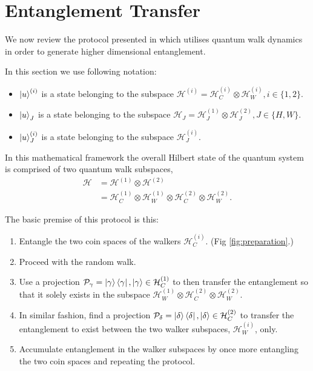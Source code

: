 \section{Entanglement Transfer}
We now review the protocol presented in \cite{giordani2020} which utilises quantum walk dynamics in order to generate higher dimensional entanglement. 

In this section we use following notation:
\begin{itemize}
    \item $\ket{u}^{(i)}$ is a state belonging to the subspace $\mathcal{H}^{(i)} = \mathcal{H}^{(i)}_C \otimes \mathcal{H}^{(i)}_W, i\in\{1,2\}$.
    \item $\ket{u}_J$ is a state belonging to the subspace $\mathcal{H}_J = \mathcal{H}^{(1)}_J \otimes \mathcal{H}^{(2)}_J, J\in\{H,W\}$.
    \item  $\ket{u}^{(i)}_J$ is a state belonging to the subspace $\mathcal{H}^{(i)}_J$.
\end{itemize}

In this mathematical framework the overall Hilbert state of the quantum system is comprised of two quantum walk subspaces,
\begin{align}
    \mathcal{H} &= \mathcal{H}^{(1)} \otimes \mathcal{H}^{(2)}\\
                &= \mathcal{H}^{(1)}_C \otimes \mathcal{H}^{(1)}_W \otimes \mathcal{H}^{(2)}_C \otimes \mathcal{H}^{(2)}_W.
\end{align}

The basic premise of this protocol is this:
\begin{enumerate}
    \item Entangle the two coin spaces of the walkers $\mathcal{H}^{(i)}_C$. (Fig \ref{fig:preparation}.)
    \item Proceed with the random walk.
    \item Use a projection $\mathcal{P}_\gamma = \ket{\gamma}\bra{\gamma}, \ket{\gamma}\in\mathcal{H}^{(1)}_C$ to then transfer the entanglement so that it solely exists in the subspace $\mathcal{H}^{(1)}_W \otimes \mathcal{H}^{(2)}_C \otimes \mathcal{H}^{(2)}_W$.
    \item In similar fashion, find a projection $\mathcal{P}_\delta = \ket{\delta}\bra{\delta}, \ket{\delta}\in\mathcal{H}^{(2)}_C$ to transfer the entanglement to exist between the two walker subspaces, $\mathcal{H}^{(i)}_W$, only. 
    \item Accumulate entanglement in the walker subspaces by once more entangling the two coin spaces and repeating the protocol.
\end{enumerate}

